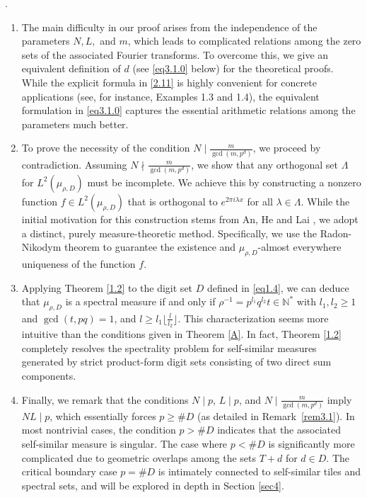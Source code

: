 \documentclass[11pt]{article}
\numberwithin{equation}{section}
\begin{document}
. 
	\begin{enumerate}[\rm(1)]
		
		\item 
		The main difficulty in our proof arises from the independence of the parameters $N, L,$ and $m$, which leads to complicated relations among the zero sets of the associated Fourier transforms. To overcome this, we give an equivalent definition of $d$ (see \eqref{eq3.1.0} below) for the theoretical proofs. While the explicit formula in \eqref{2.11} is highly convenient for concrete applications (see, for instance, Examples 1.3 and 1.4), the equivalent formulation in \eqref{eq3.1.0} captures the essential arithmetic relations among the parameters much better.
		
		\item 
		To prove the necessity of the condition $N \mid \frac{m}{\gcd(m,p^d)}$, we proceed by contradiction. Assuming $N \nmid \frac{m}{\gcd(m,p^d)}$, we show that any orthogonal set $\Lambda$ for $L^2(\mu_{\rho,D})$ must be incomplete. We achieve this by constructing a nonzero function $f \in L^2(\mu_{\rho,D})$ that is orthogonal to $e^{2\pi i \lambda x}$ for all $\lambda \in \Lambda$. While the initial motivation for this construction stems from An, He and Lai \cite{An-He-Lai2023}, we adopt a distinct, purely measure-theoretic method. Specifically, we use the Radon-Nikodym theorem to guarantee the existence and $\mu_{\rho,D}$-almost everywhere uniqueness of the function $f$. 
		
		\item 
	   Applying Theorem \ref{1.2} to the digit set $D$ defined in \eqref{eq1.4}, we can deduce that $\mu_{\rho, D}$ is a spectral measure if and only if $\rho^{-1}=p^{l_1}q^{l_2}t \in \mathbb{N}^{*}$ with $l_1,l_2 \geq 1$ and $\gcd(t,pq)=1$, and $l\geq l_1\lfloor\frac{l}{l_2}\rfloor$. This characterization seems more intuitive than the conditions given in Theorem \ref{A}. 
			In fact, Theorem \ref{1.2} completely resolves the spectrality problem for self-similar measures generated by strict product-form digit sets consisting of two direct sum components.
	
		
	
		
		\item 
		Finally, we remark that the conditions $N \mid p$, $L \mid p$, and $N \mid \frac{m}{\gcd(m,p^d)}$ imply $NL \mid p$, which essentially forces $p \geq \# D$ (as detailed in Remark~\ref{rem3.1}). In most nontrivial cases, the condition $p > \# D$ indicates that the associated self-similar measure is singular. The case where $p < \# D$ is significantly more complicated due to geometric overlaps among the sets $T+d$ for $d \in D$. The critical boundary case $p = \# D$ is intimately connected to self-similar tiles and spectral sets, and will be explored in depth in Section \ref{sec4}.
		
\end{enumerate}
\end{document}
